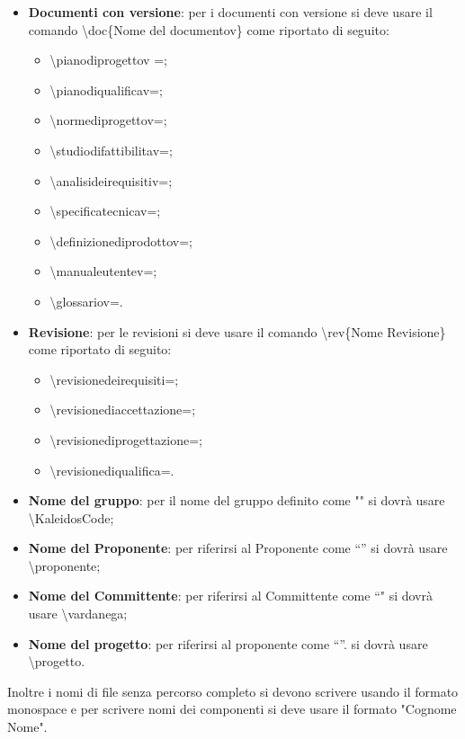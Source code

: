 \documentclass[../NormeDiProgetto.tex]{subfiles}
\begin{document}
\begin{itemize}
\begin{itemize}
					\end{itemize}	
				\item \textbf{Documenti con versione}: per i documenti con versione si deve usare il comando \textbackslash doc\{Nome del documentov\} come riportato di seguito:
				\begin{itemize}
					\item \textbackslash pianodiprogettov =\pianodiprogettov ;
					\item \textbackslash pianodiqualificav=\pianodiqualificav ;
					\item \textbackslash normediprogettov=\normediprogettov ;
					\item \textbackslash studiodifattibilitav=\studiodifattibilitav ;
					\item \textbackslash analisideirequisitiv=\analisideirequisitiv ;
					\item \textbackslash specificatecnicav=\specificatecnicav ;
					\item \textbackslash definizionediprodottov= ;
					\item \textbackslash manualeutentev=\manualeutente ;
					\item \textbackslash glossariov=\glossariov .
				\end{itemize}	
				\item \textbf{Revisione}: per le revisioni si deve usare il comando \textbackslash rev\{Nome Revisione\} come riportato di seguito:
					\begin{itemize}
						\item \textbackslash revisionedeirequisiti=\revisionedeirequisiti ;
						\item \textbackslash revisionediaccettazione=\revisionediaccettazione ;
						\item \textbackslash revisionediprogettazione=\revisionediprogettazione ;
						\item \textbackslash revisionediqualifica=\revisionediqualifica .
											
					\end{itemize}
				\item \textbf{Nome del gruppo}: per il nome del gruppo definito come "\kaleidoscode " si dovrà usare \textbackslash KaleidosCode;
				\item \textbf{Nome del Proponente}: per riferirsi al Proponente come 	“\proponente ” si dovrà usare \textbackslash proponente;	
				\item \textbf{Nome del Committente}: per riferirsi al Committente come “\vardanega "  si dovrà usare \textbackslash vardanega;
				\item \textbf{Nome del progetto}: per riferirsi al proponente come “\progetto ”. si dovrà usare \textbackslash progetto.
			\end{itemize}
		Inoltre i nomi di file senza percorso completo si devono scrivere usando il formato monospace e per scrivere nomi dei componenti si deve usare il formato "Cognome Nome". 
		
\end{document}

